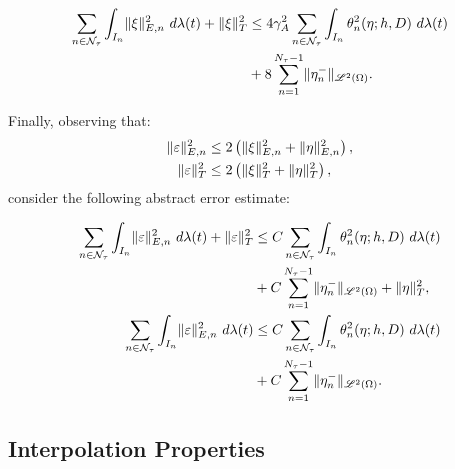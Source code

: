 \begin{lemma}
    \begin{align}
        \sum_{n \in \mathcal{N}_{\tau}} \int_{I_n} \lVert \xi \rVert_{E, n}^2 ~ d \lambda(t) + \lVert \xi \rVert_T^2 &\leq 4 \gamma_{A}^2 \sum_{n \in \mathcal{N}_{\tau}} \int_{I_n} \theta_n^2(\eta; h, D) ~ d \lambda(t) \\
        &+ 8 \sum_{n = 1}^{N_{\tau} - 1} \lVert \eta_n^- \rVert_{\mathscr{L}^{2}(\Omega)}. \notag
    \end{align}
\end{lemma}

Finally, observing that:
\begin{align}
    \lVert \varepsilon \rVert_{E, n}^2 &\leq 2 \left( \lVert \xi \rVert_{E, n}^2 + \lVert \eta \rVert_{E, n}^2 \right), \\
    \lVert \varepsilon \rVert_T^2 &\leq 2 \left( \lVert \xi \rVert_T^2 + \lVert \eta \rVert_T^2 \right),
\end{align}
consider the following abstract error estimate:
\begin{lemma}
    \begin{align}
        \sum_{n \in \mathcal{N}_{\tau}} \int_{I_n} \lVert \varepsilon \rVert_{E, n}^2 ~ d \lambda(t) + \lVert \varepsilon \rVert_T^2 &\leq C \sum_{n \in \mathcal{N}_{\tau}} \int_{I_n} \theta_n^2(\eta; h, D) ~ d \lambda(t) \\
        &+ C \sum_{n = 1}^{N_{\tau} - 1} \lVert \eta_n^- \rVert_{\mathscr{L}^{2}(\Omega)} + \lVert \eta \rVert_T^2, \notag \\ 
        \sum_{n \in \mathcal{N}_{\tau}} \int_{I_n} \lVert \varepsilon \rVert_{E, n}^2 ~ d \lambda(t) &\leq C \sum_{n \in \mathcal{N}_{\tau}} \int_{I_n} \theta_n^2(\eta; h, D) ~ d \lambda(t) \\
        &+ C \sum_{n = 1}^{N_{\tau} - 1} \lVert \eta_n^- \rVert_{\mathscr{L}^{2}(\Omega)}. \notag
    \end{align}
\end{lemma}

\newpage
\subsection{Interpolation Properties}